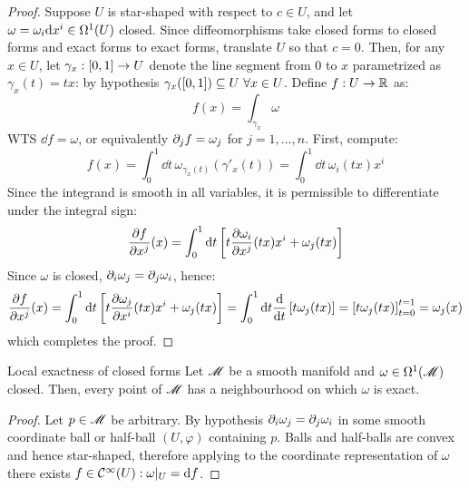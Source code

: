 \begin{proofbox}
  \begin{proof}
    Suppose $ U $ is star-shaped with respect to $ c \in U $, and let $ \omega = \omega_i \mathrm{d} x^i \in \Omega^{1}(U) $ closed. Since diffeomorphisms take closed forms to closed forms and exact forms to exact forms, translate $ U $ so that $ c = 0 $. Then, for any $ x \in U $, let $ \gamma_x : [0,1] \rightarrow U $ denote the line segment from $ 0 $ to $ x $ parametrized as $ \gamma_x(t) = tx $: by hypothesis $ \gamma_x([0,1]) \subseteq U \,\,\forall x \in U $. Define $ f : U \rightarrow \mathbb{R} $ as:
    \begin{equation*}
      f(x) = \int_{\gamma_x} \omega
    \end{equation*}
    WTS $ \dd f = \omega $, or equivalently $ \partial_j f = \omega_j $ for $ j = 1 , \dots , n $. First, compute:
    \begin{equation*}
      f(x) = \int_0^1 \dd t \, \omega_{\gamma_x(t)}(\gamma'_x(t)) = \int_0^1 \dd t \, \omega_i(tx) x^i
    \end{equation*}
    Since the integrand is smooth in all variables, it is permissible to differentiate under the integral sign:
    \begin{equation*}
      \frac{\partial f}{\partial x^j}(x) = \int_0^1 \mathrm{d} t \left[ t \frac{\partial \omega_i}{\partial x^j}(tx) x^i + \omega_j(tx) \right]
    \end{equation*}
    Since $ \omega $ is closed, $ \partial_i \omega_j = \partial_j \omega_i $, hence:
    \begin{equation*}
      \frac{\partial f}{\partial x^j}(x) = \int_0^1 \mathrm{d} t \left[ t \frac{\partial \omega_j}{\partial x^i}(tx) x^i + \omega_j(tx) \right] = \int_0^1 \mathrm{d} t \frac{\mathrm{d}}{\mathrm{d} t} \left[ t \omega_j(tx) \right] = \left[ t \omega_j(tx) \right]_{t = 0}^{t = 1} = \omega_j(x)
    \end{equation*}
    which completes the proof.
  \end{proof}
\end{proofbox}

\begin{corollary}{Local exactness of closed forms}{}
  Let $ \mathscr{M} $ be a smooth manifold and $ \omega \in \Omega^{1}(\mathscr{M}) $ closed. Then, every point of $ \mathscr{M} $ has a neighbourhood on which $ \omega $ is exact.
\end{corollary}

\begin{proofbox}
  \begin{proof}
    Let $ p \in \mathscr{M} $ be arbitrary. By hypothesis $ \partial_i \omega_j = \partial_j \omega_i $ in some smooth coordinate ball or half-ball $ (U,\varphi) $ containing $ p $. Balls and half-balls are convex and hence star-shaped, therefore applying  to the coordinate representation of $ \omega $ there exists $ f \in \mathcal{C}^{\infty}(U) : \omega \vert_U = \mathrm{d} f $.
  \end{proof}
\end{proofbox}

